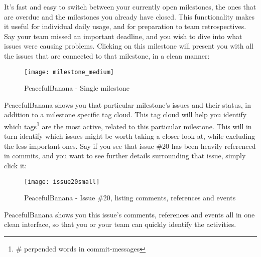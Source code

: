 It's fast and easy to switch between your currently open milestones, the ones that are overdue and the milestones you already have closed. This functionality makes it useful for individual daily usage, and for preparation to team retrospectives. Say your team missed an important deadline, and you wish to dive into what issues were causing problems. Clicking on this milestone will present you with all the issues that are connected to that milestone, in a clean manner:
\begin{figure}[h!]
\centering
	\texttt{[image: milestone\_medium]}
\caption{PeacefulBanana - Single milestone}
\label{milestonessingular}
\end{figure}
PeacefulBanana shows you that particular milestone's issues and their status, in addition to a milestone specific tag cloud. This tag cloud will help you identify which tags\footnote{\# perpended words in commit-messages} are the most active, related to this particular milestone. This will in turn identify which issues might be worth taking a closer look at, while excluding the less important ones. 
Say if you see that issue \#20 has been heavily referenced in commits, and you want to see further details surrounding that issue, simply click it:
\begin{figure}[h!]
\centering
	\texttt{[image: issue20small]}
\caption{PeacefulBanana - Issue \#20, listing comments, references and events}
\label{issue20small}
\end{figure}
PeacefulBanana shows you this issue's comments, references and events all in one clean interface, so that you or your team can quickly identify the activities. 

%
%

